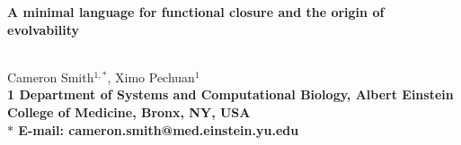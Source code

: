 \begin{flushleft}
{\Large
\textbf{A minimal language for functional closure and the origin of evolvability}
}

\\
Cameron Smith$^{1, \ast}$,
Ximo Pechuan$^{1}$
\\
\bf{1} Department of Systems and Computational Biology, Albert Einstein College of Medicine, Bronx, NY, USA
\\
$\ast$ E-mail: cameron.smith@med.einstein.yu.edu
\end{flushleft}
